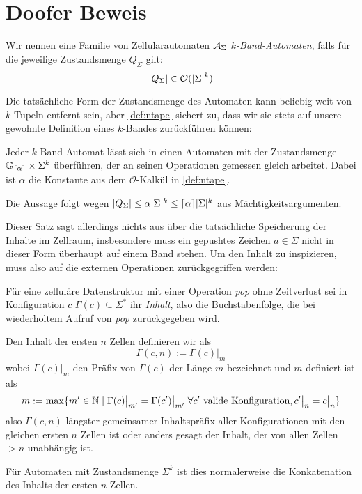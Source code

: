 \documentclass{article}
\begin{document}
\section{Doofer Beweis}

\begin{definition}
    Wir nennen eine Familie von Zellularautomaten $\mathcal{A}_\Sigma$ \emph{$k$-Band-Automaten}, falls für die jeweilige Zustandsmenge $Q_\Sigma$ gilt:
    \begin{equation}
        \lvert Q_\Sigma\rvert \in \mathcal{O}(\lvert\Sigma\rvert^k) \label{def:ntape}
    \end{equation}
\end{definition}

Die tatsächliche Form der Zustandsmenge des Automaten kann beliebig weit von $k$-Tupeln entfernt sein, aber \eqref{def:ntape} sichert zu, dass wir sie stets auf unsere gewohnte Definition eines $k$-Bandes zurückführen können:

\begin{satz}
    \label{thm:tape-hom}
    Jeder $k$-Band-Automat lässt sich in einen Automaten mit der Zustandsmenge $\mathbb{G}_{\lceil\alpha\rceil} \times \Sigma^k$ überführen, der an seinen Operationen gemessen gleich arbeitet. Dabei ist $\alpha$ die Konstante aus dem $\mathcal{O}$-Kalkül in \eqref{def:ntape}.

    \begin{beweis}
        Die Aussage folgt wegen $\lvert Q_\Sigma\rvert \leq \alpha \lvert\Sigma\rvert^k \leq \lceil\alpha\rceil \lvert\Sigma\rvert^k$ aus Mächtigkeitsargumenten.
    \end{beweis}
\end{satz}

Dieser Satz sagt allerdings nichts aus über die tatsächliche Speicherung der Inhalte im Zellraum, insbesondere muss ein gepushtes Zeichen $a \in \Sigma$ nicht in dieser Form überhaupt auf einem Band stehen. Um den Inhalt zu inspizieren, muss also auf die externen Operationen zurückgegriffen werden:

\begin{definition}
    Für eine zelluläre Datenstruktur mit einer Operation \emph{pop} ohne Zeitverlust sei in Konfiguration $c$ $\Gamma(c) \subseteq \Sigma^*$ ihr \emph{Inhalt}, also die Buchstabenfolge, die bei wiederholtem Aufruf von \emph{pop} zurückgegeben wird.

    Den Inhalt der ersten $n$ Zellen definieren wir als
        \[ \Gamma(c,n) := \Gamma(c) \big|_m \]
    wobei $\Gamma(c) \big|_m$ den Präfix von $\Gamma(c)$ der Länge $m$ bezeichnet und $m$ definiert ist als
    \[ m := \max \{m' \in \mathbb{N} \mid \Gamma(c) \big|_{m'} = \Gamma(c') \big|_{m'} \;\forall c' \text{ valide Konfiguration}, c' \big|_n = c \big|_n \} \]
    also $\Gamma(c,n)$ längster gemeinsamer Inhaltspräfix aller Konfigurationen mit den gleichen ersten $n$ Zellen ist oder anders gesagt der Inhalt, der von allen Zellen $> n$ unabhängig ist.

    Für Automaten mit Zustandsmenge $\Sigma^k$ ist dies normalerweise die Konkatenation des Inhalts der ersten $n$ Zellen.
\end{definition}
\end{document}
